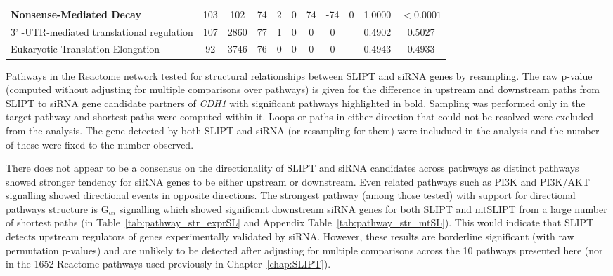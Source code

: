 \begin{table*}[!htb]
{{\begin{threeparttable}
\begin{tabular}{l|cc|cc|cccc|cc}
\rowcolor{black!5}
\textbf{Nonsense-Mediated Decay}                   & 103         & 102          & 74            & 2           & 0    & 74   & -74     & 0            & 1.0000             & $<0.0001$                   \\
\rowcolor{black!10}
3' -UTR-mediated translational regulation & 107         & 2860         & 77            & 1           & 0    & 0    & 0       &              & 0.4902             & 0.5027              \\
\rowcolor{black!5}
Eukaryotic Translation Elongation         & 92          & 3746         & 76            & 0           & 0    & 0    & 0       &              & 0.4943             & 0.4933              \\
\hline
\end{tabular}
\begin{tablenotes}
\raggedright \small
Pathways in the Reactome network tested for structural relationships between \gls{SLIPT} and \gls{siRNA} genes by resampling. The raw p-value (computed without adjusting for multiple comparisons over \glspl{pathway}) is given for the difference in upstream and downstream paths from \gls{SLIPT} to \gls{siRNA} gene candidate partners of \textit{CDH1} with significant \glspl{pathway} highlighted in bold. Sampling was performed only in the target \gls{pathway} and \glspl{shortest path} were computed within it. Loops or paths in either direction that could not be resolved were excluded from the analysis. The gene detected by both \gls{SLIPT} and \gls{siRNA} (or resampling for them) were includued in the analysis and the number of these were fixed to the number observed.
\end{tablenotes}
\end{threeparttable}
}
}
\end{table*}

There does not appear to be a consensus on the directionality of \gls{SLIPT} and \gls{siRNA} candidates across \glspl{pathway} as distinct \glspl{pathway} showed stronger tendency for \gls{siRNA} genes to be either upstream or downstream. Even related \glspl{pathway} such as \gls{PI3K} and PI3K/AKT signalling showed directional events in opposite directions. The strongest \gls{pathway} (among those tested) with support for directional \glspl{pathway} structure is G$_{\alpha i}$ signalling which showed significant downstream \gls{siRNA} genes for both SLIPT and \acrshort{mtSLIPT} from a large number of \glspl{shortest path} (in Table~\ref{tab:pathway_str_exprSL} and Appendix Table~\ref{tab:pathway_str_mtSL}). This would indicate that \gls{SLIPT} detects upstream regulators of genes experimentally validated by \gls{siRNA}. However, these results are borderline significant (with raw permutation p-values) and are unlikely to be detected after adjusting for multiple comparisons across the 10 \glspl{pathway} presented here (nor in the 1652 Reactome \glspl{pathway} used previously in Chapter~\ref{chap:SLIPT}).

